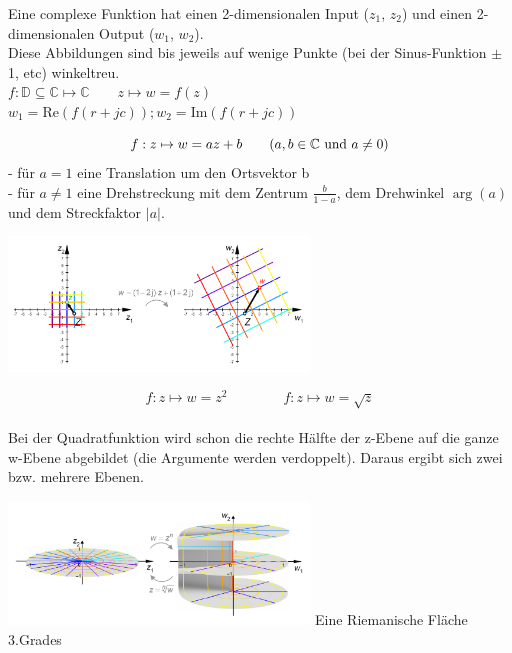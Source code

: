 Eine complexe Funktion hat einen 2-dimensionalen Input ($z_1$, $z_2$) und einen
2-dimensionalen Output ($w_1$, $w_2$). \\
Diese Abbildungen sind bis jeweils auf wenige Punkte (bei der Sinus-Funktion
$\pm$1, etc) winkeltreu.\\
$ f: \mathbb{D} \subseteq \mathbb{C} \mapsto \mathbb{C} \qquad z  \mapsto w = f(z)$\\
$w_1 = \text{Re}(f(r+jc)); w_2 = \text{Im}(f(r+jc))$ 
 

  \begin{minipage}{9cm}
       $$ f : z \mapsto w = az + b \qquad (a, b \in \mathbb{C} \text{ und } a \neq0)\\$$
    - für $a = 1$ eine Translation um den Ortsvektor b \\
    - für $a \neq 1$ eine Drehstreckung mit dem Zentrum $\frac{b}{1-a}$, dem 
    Drehwinkel $\arg(a)$ und dem Streckfaktor $|a|$.  
    \end{minipage}
  \hspace{2cm}
  \begin{minipage}{8cm}
      \includegraphics[width=8cm]{./bilder/LineareFunktion.png}
    \end{minipage}

  \begin{minipage}{9cm}
      $$ f : z \mapsto w = z^2 \qquad \qquad f : z \mapsto w = \sqrt{z} $$\\
    Bei der Quadratfunktion wird schon die rechte Hälfte der z-Ebene auf die ganze
    w-Ebene abgebildet (die Argumente werden verdoppelt). Daraus ergibt sich
    zwei bzw. mehrere Ebenen.
    \end{minipage}
  \hspace{2cm}
  \begin{minipage}{8cm}
      \includegraphics[width=8cm]{./bilder/RiemannischeFlaeche.png} 
      Eine Riemanische Fläche 3.Grades
    \end{minipage}


